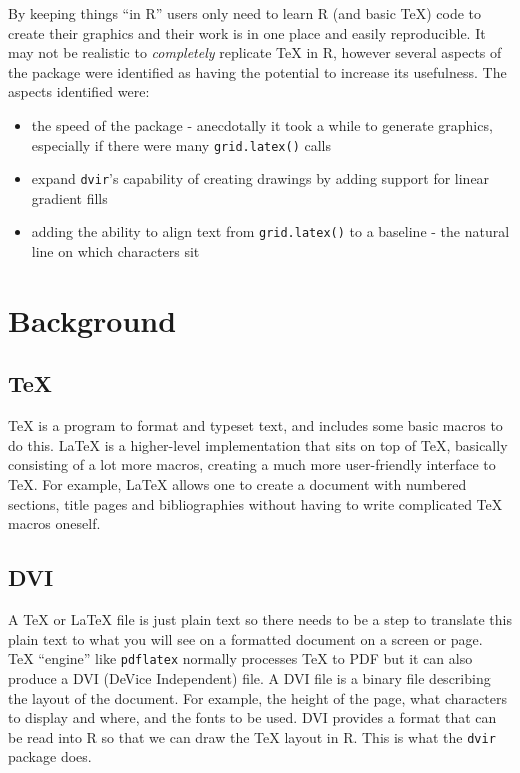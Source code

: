 \documentclass[]{article}
\providecommand{\tightlist}{%
  \setlength{\itemsep}{0pt}\setlength{\parskip}{0pt}}
\begin{document}
By keeping things ``in R'' users only need to learn R (and basic \TeX)
code to create their graphics and their work is in one place and easily
reproducible. It may not be realistic to \emph{completely} replicate
\TeX{} in R, however several aspects of the package were identified as
having the potential to increase its usefulness. The aspects identified
were:

\begin{itemize}
\tightlist
\item
  the speed of the package - anecdotally it took a while to generate
  graphics, especially if there were many \texttt{grid.latex()} calls
\item
  expand \texttt{dvir}'s capability of creating \Tikz{} drawings by
  adding support for linear gradient fills
\item
  adding the ability to align text from \texttt{grid.latex()} to a
  baseline - the natural line on which characters sit
\end{itemize}

\newpage{}

\section{Background}\label{background}

\subsection{\texorpdfstring{\TeX{}}{}}\label{section}

\TeX{} is a program to format and typeset text, and includes some basic
macros to do this. \LaTeX{} is a higher-level implementation that sits
on top of \TeX{}, basically consisting of a lot more macros, creating a
much more user-friendly interface to \TeX{}. For example, \LaTeX{}
allows one to create a document with numbered sections, title pages and
bibliographies without having to write complicated \TeX{} macros
oneself.

\subsection{DVI}\label{dvi}

A \TeX{} or \LaTeX{} file is just plain text so there needs to be a step
to translate this plain text to what you will see on a formatted
document on a screen or page. \TeX{} ``engine'' like \texttt{pdflatex}
normally processes \TeX{} to PDF but it can also produce a DVI (DeVice
Independent) file. A DVI file is a binary file describing the layout of
the document. For example, the height of the page, what characters to
display and where, and the fonts to be used. DVI provides a format that
can be read into R so that we can draw the \TeX{} layout in R. This is
what the \texttt{dvir} package does.
\end{document}
